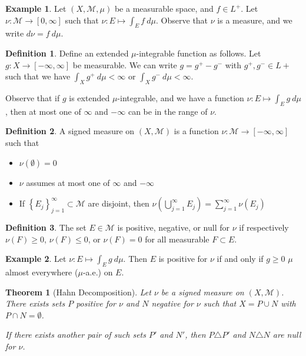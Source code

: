 \documentclass[11pt]{article}
\newtheorem{thm}{Theorem}[section]
\theoremstyle{definition}
\newtheorem{defn}{Definition}[section]
\newtheorem{example}{Example}[section]
\newcommand{\set}[1]{\left\{ #1 \right\}}
\newcommand{\m}[1]{\mathcal{#1}}
\begin{document}
\begin{example}
  Let $(X,\m{M},\mu)$ be a measurable space, and $f\in L^+$. Let $\nu:\m{M}\to[0,\infty]$
  such that $\nu:E\mapsto\int_Ef~d\mu$. Observe that $\nu$ is a measure, and we write
  $d\nu=f~d\mu$. 
\end{example}

\begin{defn}
  Define an extended $\mu$-integrable function as follows.  Let $g:X\to[-\infty,\infty]$
  be measurable. We can write $g=g^+-g^-$ with $g^+,g^-\in L+$ such that we have
  $\int_Xg^+~d\mu<\infty$ or $\int_Xg^-~d\mu<\infty$. 
\end{defn}

Observe that if $g$ is extended $\mu$-integrable, and we have a function
$\nu:E\mapsto\int_Eg~d\mu$, then at most one of $\infty$ and $-\infty$ can be in the range
of $\nu$. 

\begin{defn}
  A signed measure on $(X,\m{M})$ is a function $\nu:\m{M}\to[-\infty,\infty]$ such that
  \begin{itemize}
    \item $\nu(\emptyset)=0$
    \item $\nu$ assumes at most one of $\infty$ and $-\infty$
    \item If $\set{E_j}_{j=1}^\infty\subset\m{M}$ are disjoint, then
    $\nu\left(\bigcup_{j=1}^\infty E_j\right) = \sum_{j=1}^\infty\nu(E_j)$
  \end{itemize}
\end{defn}

\begin{defn}
  The set $E\in\m{M}$ is positive, negative, or null for $\nu$ if respectively
  $\nu(F)\ge0$, $\nu(F)\le0$, or $\nu(F)=0$ for all measurable $F\subset E$.
\end{defn}

\begin{example}
  Let $\nu:E\mapsto\int_Eg~d\mu$. Then $E$ is positive for $\nu$ if and only if $g\ge0$
  $\mu$ almost everywhere ($\mu$-a.e.) on $E$. 
\end{example}

\begin{thm}[Hahn Decomposition]
  Let $\nu$ be a signed measure on $(X,\m{M})$. There exists sets $P$ positive for $\nu$
  and $N$ negative for $\nu$ such that $X=P\cup N$ with $P\cap N = \emptyset$.

  If there exists another pair of such sets $P'$ and $N'$, then $P\triangle P'$ and
  $N\triangle N$ are null for $\nu$. 
\end{thm}
\end{document}
